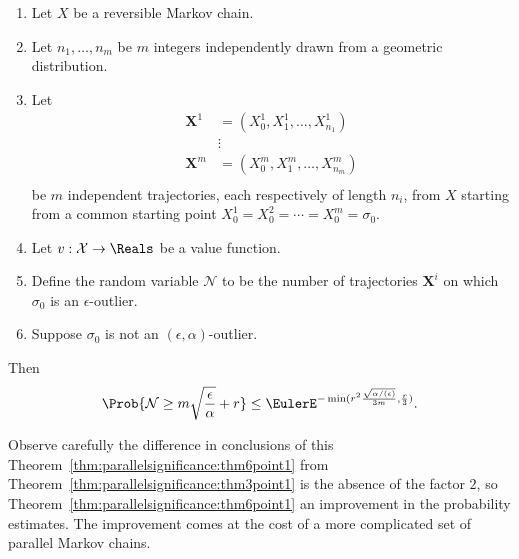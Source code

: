 \documentclass[12pt]{article}
\begin{document}
\begin{theorem}
    \label{thm:parallelsignificance:thm6point1}
    \begin{enumerate}
        \item
            Let \( X \) be a reversible Markov chain.
          \item
            Let \(n_1, \dots, n_m \) be \( m \) integers independently
            drawn from a geometric distribution.
        \item
            Let
            \begin{align*}
                \mathbf{X}^1 &= (X_0^1, X_1^1, \dots, X_{n_1}^1 )\\
                &\vdots \\
                \mathbf{X}^m &= (X_0^m, X_1^m, \dots, X_{n_m}^m )\\
            \end{align*}
            be \( m \) independent trajectories, each respectively  of length \( n_{i} \), from \(
            X \) starting from a common starting point \( X_0^1 =
            X_0^2 = \cdots = X_0^m = \sigma_0 \). 
        \item
            Let \( v :  \mathcal{X} \to \Reals \) be a value function.
        \item
            Define the random variable \( \mathcal{N} \) to be the
            number of trajectories \( \mathbf{X}^i \) on which \( \sigma_0
            \) is an \( \epsilon \)-outlier.
        \item
            Suppose \( \sigma_0 \) is not an \( (\epsilon, \alpha) \)-outlier.
    \end{enumerate}
    Then
    \[
        \Prob{\mathcal{N} \ge m \sqrt{\frac{\epsilon}{\alpha}} + r} \le
        \EulerE^{-\min(r^2 \frac{\sqrt{\alpha/(\epsilon)}}{3m}, \frac{r}
        {3})}.
    \]
\end{theorem}

\begin{remark}
  Observe carefully the difference in conclusions of this
  Theorem~\ref{thm:parallelsignificance:thm6point1} from
Theorem~\ref{thm:parallelsignificance:thm3point1} is the absence of
the factor $2$, so Theorem~\ref{thm:parallelsignificance:thm6point1}
an improvement in the probability estimates.  The improvement comes at
the cost of a more complicated set of parallel Markov chains.
\end{remark}
\end{document}
